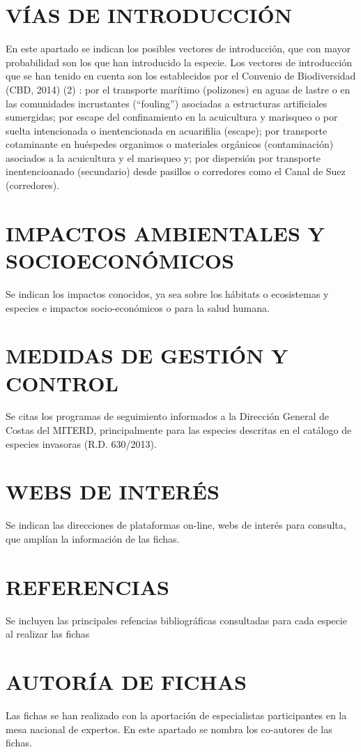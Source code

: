 \documentclass{article}
\begin{document}
\section*{VÍAS DE INTRODUCCIÓN}
En este apartado se indican los posibles vectores de introducción, que con mayor probabilidad son los que han introducido la especie. Los vectores de introducción que se han tenido en cuenta son los establecidos por el Convenio de Biodiversidad (CBD, 2014) (2) : por el transporte marítimo (polizones) en aguas de lastre o en las comunidades incrustantes (“fouling”) asociadas a estructuras artificiales sumergidas; por escape del confinamiento  en la acuicultura y marisqueo o por suelta intencionada o inentencionada en acuarifilia (escape);  por transporte cotaminante en huéspedes organimos o materiales orgánicos (contaminación) asociados a la acuicultura y el marisqueo y; por dispersión por transporte inentencioanado (secundario) desde pasillos o corredores como el Canal de Suez (corredores). 

\section*{IMPACTOS AMBIENTALES Y SOCIOECONÓMICOS}
Se indican los impactos conocidos, ya sea sobre los hábitats o ecosistemas y especies e impactos socio-económicos o para la salud humana.

\section*{MEDIDAS DE GESTIÓN Y CONTROL} 
Se citas los programas de seguimiento informados a la Dirección General de Costas del MITERD, principalmente para las especies descritas en el catálogo de especies invasoras (R.D. 630/2013). 

\section*{WEBS DE INTERÉS}
Se indican las direcciones de plataformas on-line, webs de interés para consulta, que amplían la información de las fichas.

\section*{REFERENCIAS}
Se incluyen las principales refencias bibliográficas consultadas para cada especie al realizar las fichas

\section*{AUTORÍA DE FICHAS}
Las fichas se han realizado con la  aportación de especialistas participantes en la mesa nacional de expertos. En este apartado se nombra  los co-autores de las fichas.
\end{document}
